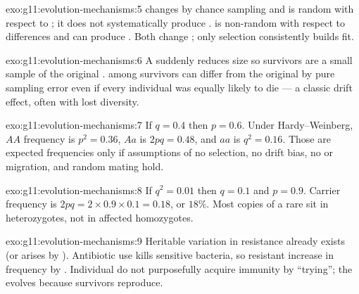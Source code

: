 \begin{solution}{exo:g11:evolution-mechanisms:5}
 changes  by chance sampling and is random with
respect to ; it does not systematically produce .  is non-random with respect to  differences and can produce
. Both change ; only selection consistently builds fit.
\end{solution}

\begin{solution}{exo:g11:evolution-mechanisms:6}
A  suddenly reduces  size so survivors are a small sample
of the original .  among survivors can differ from
the original  by pure sampling error even if every individual was
equally likely to die --- a classic drift effect, often with lost diversity.
\end{solution}

\begin{solution}{exo:g11:evolution-mechanisms:7}
If $q = 0.4$ then $p = 0.6$. Under Hardy--Weinberg, $AA$ frequency is
$p^{2} = 0.36$, $Aa$ is $2pq = 0.48$, and $aa$ is $q^{2} = 0.16$. Those are
expected  frequencies only if assumptions of no selection, no drift
bias, no  or migration, and random mating hold.
\end{solution}

\begin{solution}{exo:g11:evolution-mechanisms:8}
If $q^{2} = 0.01$ then $q = 0.1$ and $p = 0.9$. Carrier frequency is
$2pq = 2\times 0.9\times 0.1 = 0.18$, or $18\%$. Most copies of a rare
 sit in heterozygotes, not in affected homozygotes.
\end{solution}

\begin{solution}{exo:g11:evolution-mechanisms:9}
Heritable variation in resistance already exists (or arises by ).
Antibiotic use kills sensitive bacteria, so resistant  increase in
frequency by . Individual  do not purposefully acquire
immunity by ``trying''; the  evolves because survivors reproduce.
\end{solution}

